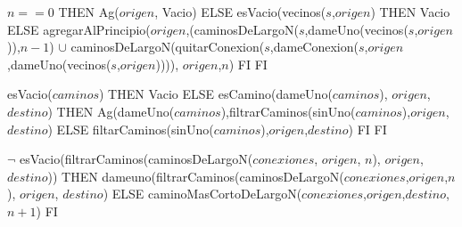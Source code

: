 \begin{tad}{}

 {\IF $n == 0$ THEN Ag($origen$, Vacio) ELSE 
{\IF esVacio(vecinos($s$,$origen$) THEN Vacio 
ELSE agregarAlPrincipio($origen$,(caminosDeLargoN($s$,dameUno(vecinos($s$,$origen$)),$n-1$) $\cup$ 
caminosDeLargoN(quitarConexion($s$,dameConexion($s$,$origen$,dameUno(vecinos($s$,$origen$)))), $origen$,$n$) FI} FI}


 {\IF esVacio($caminos$) THEN Vacio ELSE
{\IF esCamino(dameUno($caminos$), $origen$, $destino$) THEN Ag(dameUno($caminos$),filtrarCaminos(sinUno($caminos$),$origen$,$destino$) 
ELSE filtarCaminos(sinUno($caminos$),$origen$,$destino$) FI} FI}

 {\IF $\neg$ esVacio(filtrarCaminos(caminosDeLargoN($conexiones$, $origen$, $n$), $origen$, $destino$)) 
THEN dameuno(filtrarCaminos(caminosDeLargoN($conexiones$,$origen$,$n$), $origen$, $destino$) ELSE caminoMasCortoDeLargoN($conexiones$,$origen$,$destino$,$n+1$) FI}


\end{tad}

